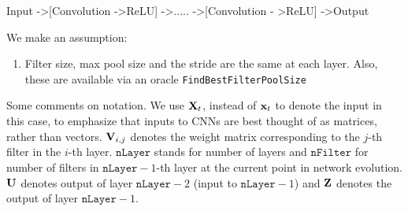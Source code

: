 \documentclass{article}
\begin{document}
Input -\textgreater [Convolution -\textgreater ReLU] -\textgreater ..... -\textgreater [Convolution - \textgreater ReLU] -\textgreater Output

We make an assumption:

\begin{enumerate}
\item Filter size, max pool size and the stride are the same at each layer. Also, these are available via an oracle \texttt{FindBestFilterPoolSize}
\end{enumerate}

Some comments on notation. We use ${\bf X}_t$, instead of ${\bf x}_t$ to denote the input in this case, to emphasize that inputs to CNNs are best thought of as matrices, rather than vectors. ${\bf V}_{i, j}$ denotes the weight matrix corresponding to the $j$-th filter in the $i$-th layer. $\texttt{nLayer}$ stands for  number of layers and $\texttt{nFilter}$ for number of filters in $\texttt{nLayer} - 1$-th layer at the current point in network evolution. ${\bf U}$ denotes output of layer $\texttt{nLayer} - 2$ (input to $\texttt{nLayer} - 1$) and ${\bf Z}$ denotes the output of layer $\texttt{nLayer} - 1$.

\iffalse
Given a dataset, cost function and regularization term, we want to learn the number of convolutional layers, number of filters in each layer, filter size and pooling size of each filter, and the weights corresponding to each filter and the output layer. The basic structure of our network is:

Input -\textgreater [Convolution -\textgreater ReLU -\textgreater Max Pooling] -\textgreater ..... -\textgreater [Convolution - \textgreater ReLU -\textgreater Max Pooling] -\textgreater Output

First of all, let us assume that we have only one convolutional layers and consider the problem of adding filters incrementally to this layer. Also assume that we have a subroutine FindBestFilterPoolSize($i$) which takes as input the index $i$ of a filter in this layer and returns the optimum filter size $f_i$ and max-pool size $p_i$ for the $i$-th filter.

Let $X \in R^{n \times n}$ be the input matrix (assume square) and $y \in R$ be a scalar output. Let $V_i \in R^{f \times f}$ be the shared matrix for the $i$-th filter in the first layer having a filter size of $f$. The output of the filter is a matrix $Z_i = V_i * X \in R^{n \times n}$. ReLU here corresponds to the function $y = max(0, x)$ where $y, x \in R$. Let us denote element-wise ReLU operation on a matrix $A$ by $s(A)$. If the pool size is $p$, we assume the stride is $p$ (non-overlapping). The output of max-pooling for input $Z_i \in R^{n \times n}$ is denoted by $POOL(Z_i) \in R^{n/p \times n/p}$. The output matrix for pooling corresponding to $i$-th filter is denoted by $W_i$.
\fi
\end{document}
